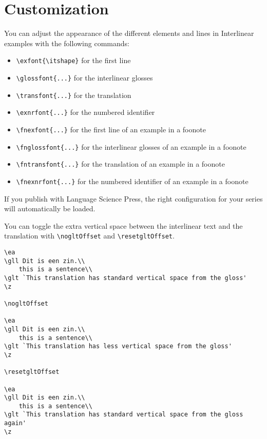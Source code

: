 \documentclass[output=paper]{langscibook}
\newcommand{\cmd}[1]{\texttt{\textbackslash#1}}
\begin{document}
\section{Customization}
You can adjust the appearance of the different elements and lines in Interlinear examples with the following commands:
\begin{itemize}
\item  \cmd{exfont\{\textbackslash itshape\}} for the first line
\item  \cmd{glossfont\{...\}} for the interlinear glosses 
\item  \cmd{transfont\{...\}} for the translation 
\item  \cmd{exnrfont\{...\}} for the numbered identifier
\medskip 
\item  \cmd{fnexfont\{...\}} for the first line of an example in a foonote
\item  \cmd{fnglossfont\{...\}} for the interlinear glosses of an example in a foonote
\item  \cmd{fntransfont\{...\}} for the translation of an example in a foonote
\item  \cmd{fnexnrfont\{...\}} for the numbered identifier of an example in a foonote
\end{itemize}
    
If you publish with Language Science Press, the right configuration for your series will automatically be loaded.

You can toggle the extra vertical space between the interlinear text and the translation with \cmd{nogltOffset} and \cmd{resetgltOffset}. 
 
\begin{lstlisting}
\ea    
\gll Dit is een zin.\\ 
    this is a sentence\\
\glt `This translation has standard vertical space from the gloss'
\z

\nogltOffset

\ea 
\gll Dit is een zin.\\ 
    this is a sentence\\
\glt `This translation has less vertical space from the gloss'
\z

\resetgltOffset

\ea 
\gll Dit is een zin.\\ 
    this is a sentence\\
\glt `This translation has standard vertical space from the gloss again'
\z
\end{lstlisting}
\end{document}
